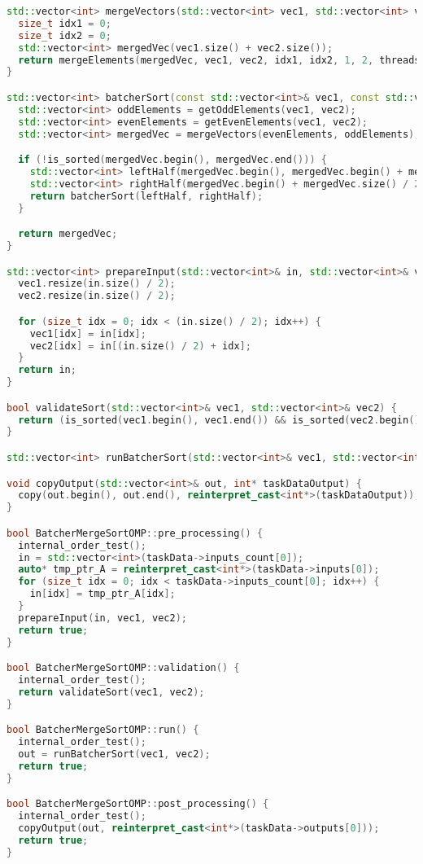 \documentclass{report}
\begin{document}
\begin{lstlisting}[language=C++,caption=OpenMP версия]
std::vector<int> mergeVectors(std::vector<int> vec1, std::vector<int> vec2, int threads_count = 4) {
  size_t idx1 = 0;
  size_t idx2 = 0;
  std::vector<int> mergedVec(vec1.size() + vec2.size());
  return mergeElements(mergedVec, vec1, vec2, idx1, idx2, 1, 2, threads_count);
}

std::vector<int> batcherSort(const std::vector<int>& vec1, const std::vector<int>& vec2) {
  std::vector<int> oddElements = getOddElements(vec1, vec2);
  std::vector<int> evenElements = getEvenElements(vec1, vec2);
  std::vector<int> mergedVec = mergeVectors(evenElements, oddElements);

  if (!is_sorted(mergedVec.begin(), mergedVec.end())) {
    std::vector<int> leftHalf(mergedVec.begin(), mergedVec.begin() + mergedVec.size() / 2);
    std::vector<int> rightHalf(mergedVec.begin() + mergedVec.size() / 2, mergedVec.end());
    return batcherSort(leftHalf, rightHalf);
  }

  return mergedVec;
}

std::vector<int> prepareInput(std::vector<int>& in, std::vector<int>& vec1, std::vector<int>& vec2) {
  vec1.resize(in.size() / 2);
  vec2.resize(in.size() / 2);

  for (size_t idx = 0; idx < (in.size() / 2); idx++) {
    vec1[idx] = in[idx];
    vec2[idx] = in[(in.size() / 2) + idx];
  }
  return in;
}

bool validateSort(std::vector<int>& vec1, std::vector<int>& vec2) {
  return (is_sorted(vec1.begin(), vec1.end()) && is_sorted(vec2.begin(), vec2.end()));
}

std::vector<int> runBatcherSort(std::vector<int>& vec1, std::vector<int>& vec2) { return batcherSort(vec1, vec2); }

void copyOutput(std::vector<int>& out, int* taskDataOutput) {
  copy(out.begin(), out.end(), reinterpret_cast<int*>(taskDataOutput));
}

bool BatcherMergeSortOMP::pre_processing() {
  internal_order_test();
  in = std::vector<int>(taskData->inputs_count[0]);
  auto* tmp_ptr_A = reinterpret_cast<int*>(taskData->inputs[0]);
  for (size_t idx = 0; idx < taskData->inputs_count[0]; idx++) {
    in[idx] = tmp_ptr_A[idx];
  }
  prepareInput(in, vec1, vec2);
  return true;
}

bool BatcherMergeSortOMP::validation() {
  internal_order_test();
  return validateSort(vec1, vec2);
}

bool BatcherMergeSortOMP::run() {
  internal_order_test();
  out = runBatcherSort(vec1, vec2);
  return true;
}

bool BatcherMergeSortOMP::post_processing() {
  internal_order_test();
  copyOutput(out, reinterpret_cast<int*>(taskData->outputs[0]));
  return true;
}
\end{lstlisting}
\end{document}
